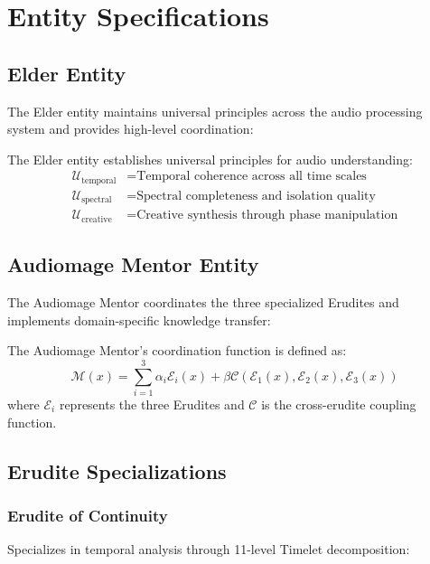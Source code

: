 \section{Entity Specifications}

\subsection{Elder Entity}

The Elder entity maintains universal principles across the audio processing system and provides high-level coordination:

\begin{definition}
The Elder entity establishes universal principles for audio understanding:
\begin{align}
\mathcal{U}_{\text{temporal}} &= \text{Temporal coherence across all time scales} \\
\mathcal{U}_{\text{spectral}} &= \text{Spectral completeness and isolation quality} \\
\mathcal{U}_{\text{creative}} &= \text{Creative synthesis through phase manipulation}
\end{align}
\end{definition}

\subsection{Audiomage Mentor Entity}

The Audiomage Mentor coordinates the three specialized Erudites and implements domain-specific knowledge transfer:

\begin{definition}
The Audiomage Mentor's coordination function is defined as:
\begin{equation}
\mathcal{M}(x) = \sum_{i=1}^{3} \alpha_i \mathcal{E}_i(x) + \beta \mathcal{C}(\mathcal{E}_1(x), \mathcal{E}_2(x), \mathcal{E}_3(x))
\end{equation}
where $\mathcal{E}_i$ represents the three Erudites and $\mathcal{C}$ is the cross-erudite coupling function.
\end{definition}

\subsection{Erudite Specializations}

\subsubsection{Erudite of Continuity}
Specializes in temporal analysis through 11-level Timelet decomposition:


